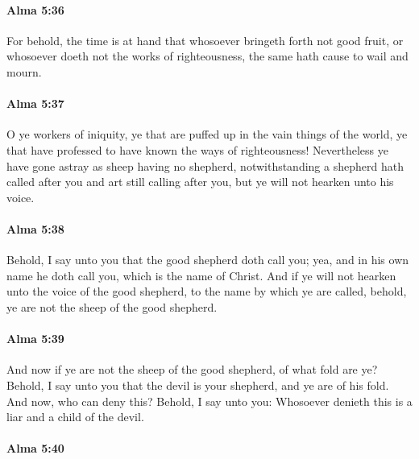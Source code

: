 		\paragraph{Alma 5:36} %
			\label{ALMA-5-36}

			For behold, the time is at hand
			that whosoever bringeth forth not good fruit,
			or whosoever doeth not the works of righteousness,
			the same hath cause to wail and mourn.

		\paragraph{Alma 5:37} %
			\label{ALMA-5-37}

			O ye workers of iniquity,
			ye that are puffed up in the vain things of the world,
			ye that have professed to have known the ways of righteousness!
			Nevertheless ye have gone astray as sheep having no shepherd,
			notwithstanding a shepherd hath called after you
			and art still calling after you,
			but ye will not hearken unto his voice.

		\paragraph{Alma 5:38} %
			\label{ALMA-5-38}

			Behold, I say unto you that the good shepherd doth call you;
			yea, and in his own name he doth call you,
			which is the name of Christ.
			And if ye will not hearken unto the voice of the good shepherd,
			to the name by which ye are called,
			behold, ye are not the sheep of the good shepherd.

		\paragraph{Alma 5:39} %
			\label{ALMA-5-39}

			And now if ye are not the sheep of the good shepherd,
			of what fold are ye?
			Behold, I say unto you
			that the devil is your shepherd,
			and ye are of his fold.
			And now, who can deny this?
			Behold, I say unto you:
			Whosoever denieth this is a liar and a child of the devil.

		\paragraph{Alma 5:40} %
			\label{ALMA-5-40}

